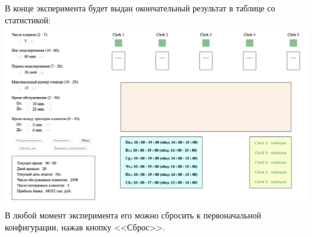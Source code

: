 \documentclass[oneside,final,12pt]{article}
\begin{document}
\clearpage

В конце эксперимента будет выдан окончательный результат в таблице со статистикой:\\

 \includegraphics[width=150mm]{ended.png}\\

В любой момент эксперимента его можно сбросить к первоначальной конфигурации, нажав кнопку <<Сброс>>.\\

\clearpage
\end{document}
